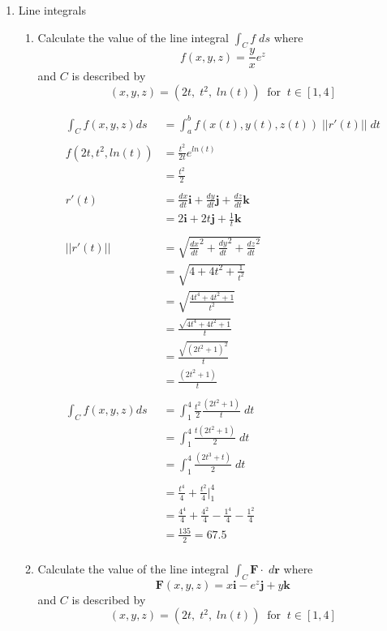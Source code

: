 \documentclass[a4paper,11pt]{article}
\begin{document}
\begin{preview}
\begin{enumerate}
\begin{enumerate}
\end{enumerate}

\item Line integrals

\begin{enumerate}
    \item Calculate the value of the line integral $\int_C f \; ds$ where
    $$ f(x,y,z) = \frac{y}{x}e^z $$
    and $C$ is described by 
    $$(x,y,z) = (2t, \; t^2, \; ln(t)) \;\;\mathrm{for} \;\; t \in [1,4]$$

    \begin{align*}
        \int_C f(x,y,z)ds &= \int_{a}^{b} f(x(t), y(t), z(t)) \;||r'(t)|| \;dt \\\\
        f(2t, t^2, ln(t)) &= \frac{t^2}{2t}e^{ln(t)} \\
        &= \frac{t^2}{2}\\\\
        r'(t) &= \frac{dx}{dt} \textbf{i} + \frac{dy}{dt} \textbf{j} +  \frac{dz}{dt} \textbf{k}\\
        &= 2 \textbf{i} + 2t \textbf{j} + \frac{1}{t} \textbf{k}\\\\
        ||r'(t)|| &= \sqrt{\frac{dx}{dt}^2  + \frac{dy}{dt}^2 +  \frac{dz}{dt}^2}\\
        &= \sqrt{4 + 4t^2 + \frac{1}{t^2}}\\
        &=\sqrt{\frac{4t^4 + 4t^2 + 1}{t^2}}\\
        &=\frac{\sqrt{4t^4 + 4t^2 + 1}}{t}\\
        &= \frac{\sqrt{(2t^2 + 1)^2}}{t}\\
        &= \frac{(2t^2 + 1)}{t}\\\\
        \int_C f(x,y,z)ds &= \int_{1}^{4} \frac{t^2}{2} \frac{(2t^2 + 1)}{t} \; dt\\
        &= \int_{1}^{4} \frac{t(2t^2 + 1)}{2} \; dt\\
        &= \int_{1}^{4} \frac{(2t^3 + t)}{2} \; dt\\\\
        &= \frac{t^4}{4}+\frac{t^2}{4} \Big|_{1}^{4}\\
        &= \frac{4^4}{4} + \frac{4^2}{4}- \frac{1^4}{4} - \frac{1^2}{4}\\
        &= \frac{135}{2} = 67.5\\
    \end{align*}

    \item Calculate the value of the line integral $\int_C \textbf{F} \cdot \; d \textbf{r}$ where
    $$ \textbf{F}(x,y,z) = x \textbf{i} - e^z \textbf{j} + y \textbf{k} $$
    and $C$ is described by
    $$(x,y,z) = (2t, \; t^2, \; ln(t)) \;\;\mathrm{for} \;\; t \in [1,4]$$


\end{enumerate}
\end{enumerate}
\end{preview}
\end{document}
